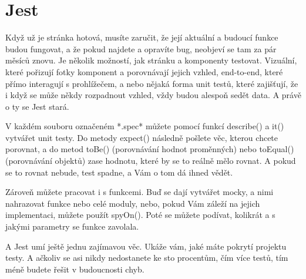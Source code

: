\section{Jest}

Když už je stránka hotová, musíte zaručit, že její aktuální a budoucí funkce budou fungovat, a že pokud najdete a opravíte bug, neobjeví se tam za pár měsíců znovu. Je několik možností, jak stránku a komponenty testovat\cite{TypesOfTests}. Vizuální, které pořizují fotky komponent a porovnávají jejich vzhled, end-to-end, které přímo interagují s prohlížečem, a nebo nějaká forma unit testů, které zajišťují, že i když se může někdy rozpadnout vzhled, vždy budou alespoň sedět data. A právě o ty se Jest stará.

V každém souboru označeném *.spec* můžete pomocí funkcí describe() a it() vytvářet unit testy. Do metody expect() následně pošlete věc, kterou chcete porovnat, a do metod toBe() (porovnávání hodnot proměnných) nebo toEqual() (porovnávání objektů) zase hodnotu, které by se to reálně mělo rovnat. A pokud se to rovnat nebude, test spadne, a Vám o tom dá ihned vědět.

Zároveň můžete pracovat i s funkcemi\cite{JestMethods}. Buď se dají vytvářet mocky, a nimi nahrazovat funkce nebo celé moduly, nebo, pokud Vám záleží na jejich implementaci, můžete použít spyOn(). Poté se můžete podívat, kolikrát a s jakými parametry se funkce zavolala.

A Jest umí ještě jednu zajímavou věc. Ukáže vám, jaké máte pokrytí projektu testy\cite{JestCoverage}. A ačkoliv se asi nikdy nedostanete ke sto procentům, čím více testů, tím méně budete řešit v budoucnosti chyb.